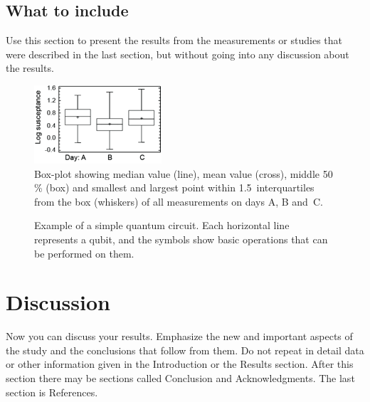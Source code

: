 \documentclass{elbioimp2}
\begin{document}
\subsection{What to include}
Use this section to present the results from the measurements or
studies that were described in the last section, but without going
into any discussion about the results.

\begin{figure}[htp]
  \centering
  \includegraphics[width=0.7\columnwidth]{assets/test-ill}
  \caption{Box-plot showing median value (line), mean value (cross),
    middle 50\,\% (box) and smallest and largest point within 
    1.5~interquartiles from the box (whiskers) of all measurements
    on days A, B and~C.\label{box-plot}}
\end{figure}


\begin{figure}[h]
  \centering
  \caption{Example of a simple quantum circuit. Each horizontal line represents a qubit, and the symbols show basic operations that can be performed on them.}
\end{figure}

\section{Discussion}
Now you can discuss your results. Emphasize the new and important
aspects of the study and the conclusions that follow from them. Do not
repeat in detail data or other information given in the Introduction
or the Results section. After this section there may be sections
called Conclusion and Acknowledgments. The last section is References.
\end{document}
